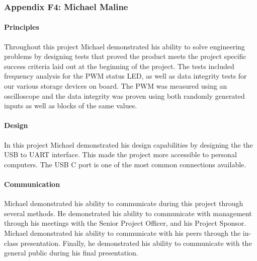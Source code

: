 \documentclass[../../main.tex]{subfiles}
\begin{document}
\subsubsection{Appendix F4: Michael Maline}

\paragraph{Principles}
Throughout this project Michael demonstrated his ability to solve engineering problems by designing tests that proved the product meets the project specific success criteria laid out at the beginning of the project. The tests included frequency analysis for the PWM status LED, as well as data integrity tests for our various storage devices on board. The PWM was measured using an oscilloscope and the data integrity was proven using both randomly generated inputs as well as blocks of the same values.

\paragraph{Design}
In this project Michael demonstrated his design capabilities by designing the the USB to UART interface. This made the project more accessible to personal computers. The USB C port is one of the most common connections available.

\paragraph{Communication}
Michael demonstrated his ability to communicate during this project through several methods. He demonstrated his ability to communicate with management through his meetings with the Senior Project Officer, and his Project Sponsor. Michael demonstrated his ability to communicate with his peers through the in-class presentation. Finally, he demonstrated his ability to communicate with the general public during his final presentation.

\end{document}
